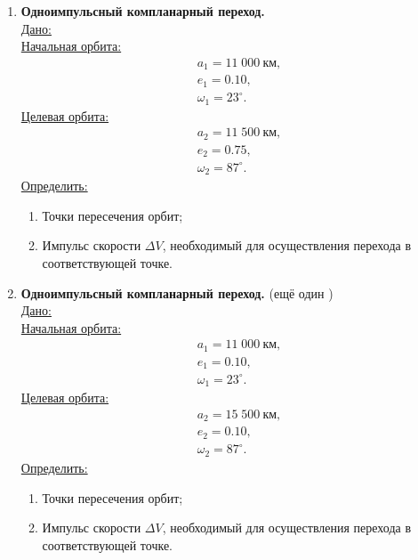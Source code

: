 \documentclass[12pt]{article}
\begin{document}
\begin{enumerate}
    \item \textbf{Одноимпульсный компланарный переход.} \\
    \underline{Дано:} \\
    \underline{Начальная орбита:}
      \begin{equation*}
          \begin{aligned}
            &a_1 = 11\;000~\text{км},\\
            &e_1 = 0.10,\\
            &\omega_1 = 23^{\circ}.
          \end{aligned}
      \end{equation*}
      \medskip
      \underline{Целевая орбита:}
      \begin{equation*}
          \begin{aligned}
            &a_2 = 11\;500~\text{км},\\
            &e_2 = 0.75,\\
            &\omega_2 = 87^{\circ}.
          \end{aligned}
      \end{equation*}
      \underline{Определить:}
       \begin{enumerate}
        \item Точки пересечения орбит;
        \item Импульс скорости $\Delta V$, необходимый для осуществления перехода в соответствующей точке.
      \end{enumerate}

    \item \textbf{Одноимпульсный компланарный переход.} (ещё один \smiley) \\
    \underline{Дано:} \\
    \underline{Начальная орбита:}
      \begin{equation*}
          \begin{aligned}
            &a_1 = 11\;000~\text{км},\\
            &e_1 = 0.10,\\
            &\omega_1 = 23^{\circ}.
          \end{aligned}
      \end{equation*}
      \medskip
      \underline{Целевая орбита:}
      \begin{equation*}
          \begin{aligned}
            &a_2 = 15\;500~\text{км},\\
            &e_2 = 0.10,\\
            &\omega_2 = 87^{\circ}.
          \end{aligned}
      \end{equation*}
      \underline{Определить:}
       \begin{enumerate}
        \item Точки пересечения орбит;
        \item Импульс скорости $\Delta V$, необходимый для осуществления перехода в соответствующей точке.
      \end{enumerate}


\end{enumerate}
\end{document}
